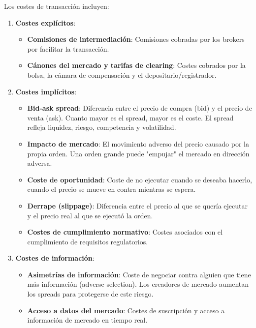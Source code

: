 \begin{teorema}
Los costes de transacción incluyen:

\begin{enumerate}
\item \textbf{Costes explícitos}:
\begin{itemize}
\item \textbf{Comisiones de intermediación}: Comisiones cobradas por los brokers por facilitar la transacción.
\item \textbf{Cánones del mercado y tarifas de clearing}: Costes cobrados por la bolsa, la cámara de compensación y el depositario/registrador.
\end{itemize}

\item \textbf{Costes implícitos}:
\begin{itemize}
\item \textbf{Bid-ask spread}: Diferencia entre el precio de compra (bid) y el precio de venta (ask). Cuanto mayor es el spread, mayor es el coste. El spread refleja liquidez, riesgo, competencia y volatilidad.
\item \textbf{Impacto de mercado}: El movimiento adverso del precio causado por la propia orden. Una orden grande puede "empujar" el mercado en dirección adversa.
\item \textbf{Coste de oportunidad}: Coste de no ejecutar cuando se deseaba hacerlo, cuando el precio se mueve en contra mientras se espera.
\item \textbf{Derrape (slippage)}: Diferencia entre el precio al que se quería ejecutar y el precio real al que se ejecutó la orden.
\item \textbf{Costes de cumplimiento normativo}: Costes asociados con el cumplimiento de requisitos regulatorios.
\end{itemize}

\item \textbf{Costes de información}:
\begin{itemize}
\item \textbf{Asimetrías de información}: Coste de negociar contra alguien que tiene más información (adverse selection). Los creadores de mercado aumentan los spreads para protegerse de este riesgo.
\item \textbf{Acceso a datos del mercado}: Costes de suscripción y acceso a información de mercado en tiempo real.
\end{itemize}
\end{enumerate}
\end{teorema}

